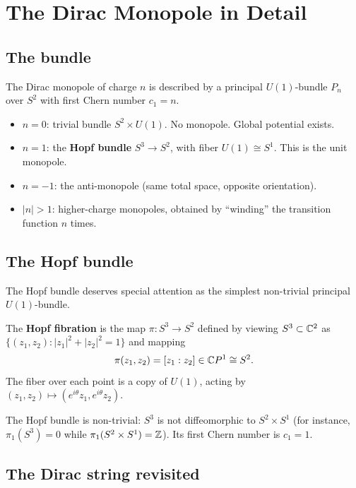 \section{The Dirac Monopole in Detail}

\subsection{The bundle}

The Dirac monopole of charge $n$ is described by a principal $U(1)$-bundle $P_n$ over $S^2$ with first Chern number $c_1 = n$.

\begin{itemize}
\item $n = 0$: trivial bundle $S^2 \times U(1)$. No monopole. Global potential exists.
\item $n = 1$: the \textbf{Hopf bundle} $S^3 \to S^2$, with fiber $U(1) \cong S^1$. This is the unit monopole.
\item $n = -1$: the anti-monopole (same total space, opposite orientation).
\item $|n| > 1$: higher-charge monopoles, obtained by ``winding'' the transition function $n$ times.
\end{itemize}

\subsection{The Hopf bundle}

The Hopf bundle deserves special attention as the simplest non-trivial principal $U(1)$-bundle.

\begin{definition}
The \textbf{Hopf fibration} is the map $\pi: S^3 \to S^2$ defined by viewing $S^3 \subset \mathbb{C}^2$ as $\{(z_1, z_2) : |z_1|^2 + |z_2|^2 = 1\}$ and mapping
\begin{equation}
\pi(z_1, z_2) = [z_1 : z_2] \in \mathbb{C} P^1 \cong S^2.
\end{equation}
The fiber over each point is a copy of $U(1)$, acting by $(z_1, z_2) \mapsto (e^{i\theta}z_1, e^{i\theta}z_2)$.
\end{definition}

The Hopf bundle is non-trivial: $S^3$ is not diffeomorphic to $S^2 \times S^1$ (for instance, $\pi_1(S^3) = 0$ while $\pi_1(S^2 \times S^1) = \mathbb{Z}$). Its first Chern number is $c_1 = 1$.

\subsection{The Dirac string revisited}

